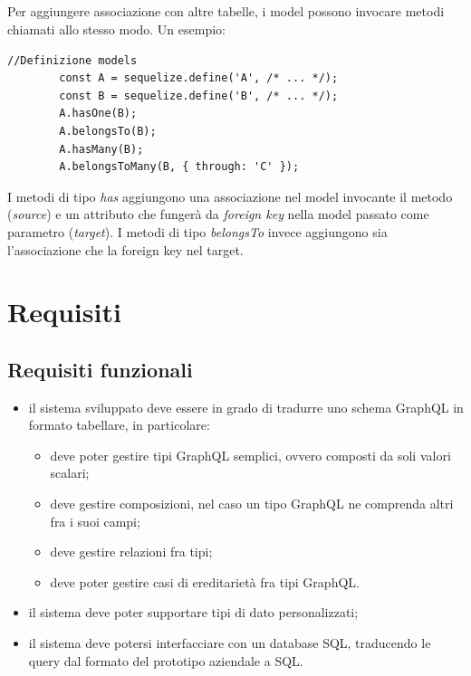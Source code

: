 \documentclass[a4paper, 12pt]{report}
\begin{document}
      \paragraph*{}
      Per aggiungere associazione con altre tabelle, i model possono invocare metodi chiamati allo stesso modo. Un esempio:
      \begin{Verbatim}[samepage=true]
        //Definizione models
        const A = sequelize.define('A', /* ... */);
        const B = sequelize.define('B', /* ... */);
        A.hasOne(B);
        A.belongsTo(B);
        A.hasMany(B);
        A.belongsToMany(B, { through: 'C' });
      \end{Verbatim}
       I metodi di tipo \emph{has} aggiungono una associazione nel model invocante il metodo (\emph{source}) e un attributo che fungerà da \emph{foreign key} nella model passato come parametro (\emph{target}).
       I metodi di tipo \emph{belongsTo} invece aggiungono sia l'associazione che la foreign key nel target.
  \newpage
  \chapter{Requisiti}
    \section{Requisiti funzionali}
      \begin{itemize}
        \item il sistema sviluppato deve essere in grado di tradurre uno schema GraphQL in formato tabellare, in particolare:
        \begin{itemize}
          \item deve poter gestire tipi GraphQL semplici, ovvero composti da soli valori scalari;
          \item deve gestire composizioni, nel caso un tipo GraphQL ne comprenda altri fra i suoi campi;
          \item deve gestire relazioni fra tipi;
          \item deve poter gestire casi di ereditarietà fra tipi GraphQL.
        \end{itemize}
        \item il sistema deve poter supportare tipi di dato personalizzati;
        \item il sistema deve potersi interfacciare con un database SQL, traducendo le query dal formato del prototipo aziendale a SQL.
      \end{itemize}
\end{document}
